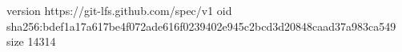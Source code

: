 version https://git-lfs.github.com/spec/v1
oid sha256:bdef1a17a617be4f072ade616f0239402e945c2bcd3d20848caad37a983ca549
size 14314
